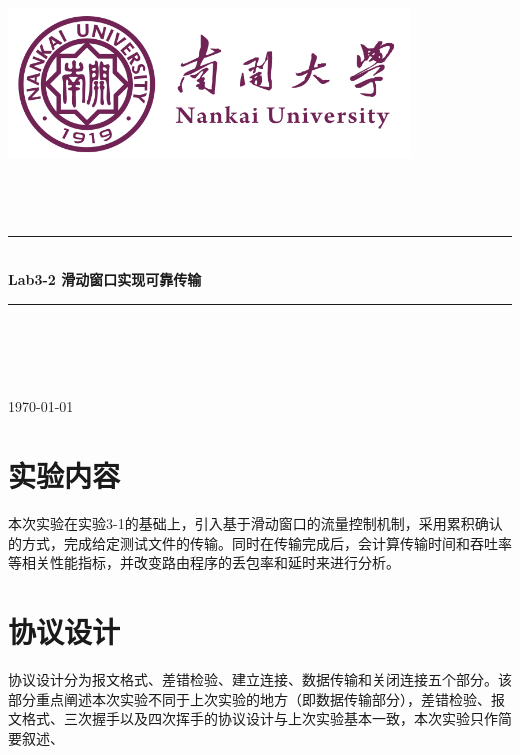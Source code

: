 \documentclass[UTF8,a4paper,10pt]{ctexart}
\newcommand{\HRule}{\rule{\linewidth}{0.5mm}}%
\begin{document}
\begin{titlepage}
    \begin{center}
    \includegraphics[width=0.8\textwidth]{NKU.png}\\[1cm]    
    \textsc{\Huge {} }\\[0.9cm]
    \textsc{\huge {}}\\[0.9cm]
    \textsc{\huge {}}\\[0.8cm]
    \HRule \\[0.9cm]
    { \LARGE \bfseries Lab3-2 滑动窗口实现可靠传输}\\[0.4cm]
    \HRule \\[2.0cm]
    \centering
    \textsc{\LARGE {}}\\[0.5cm]
    \textsc{\LARGE {}}\\[0.5cm]
    \textsc{\LARGE {}}\\[0.5cm]
    \vfill
    {\Large \today}
    \end{center}
\end{titlepage}



\newpage
\tableofcontents
\setcounter{page}{1}

\vspace{1cm}

\section{实验内容}
本次实验在实验3-1的基础上，引入基于滑动窗口的流量控制机制，采用累积确认的方式，完成给定测试文件的传输。同时在传输完成后，会计算传输时间和吞吐率等相关性能指标，并改变路由程序的丢包率和延时来进行分析。
\vspace{1cm}

\section{协议设计}
协议设计分为报文格式、差错检验、建立连接、数据传输和关闭连接五个部分。该部分重点阐述本次实验不同于上次实验的地方（即数据传输部分），差错检验、报文格式、三次握手以及四次挥手的协议设计与上次实验基本一致，本次实验只作简要叙述、
\end{document}
